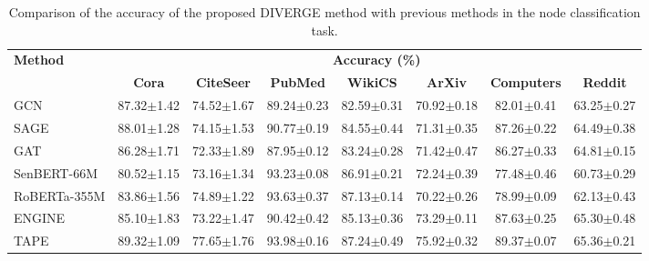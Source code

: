 \documentclass[a4paper,fleqn]{cas-sc}
\begin{document}
\begin{table}[htbp]
\centering
\caption{Comparison of the accuracy of the proposed DIVERGE method with previous methods in the node classification task.}
\label{tab:diverge_node_classification_accuracy_sota}

\small
\setlength{\tabcolsep}{3pt}
\begin{tabular*}{\textwidth}{@{\extracolsep{\fill}} lccccccc @{}}
\toprule
\multirow{2}{*}{\textbf{Method}} & \multicolumn{7}{c}{\textbf{Accuracy (\%)}} \\
\cmidrule(lr){2-8}
 & \textbf{Cora} & \textbf{CiteSeer} & \textbf{PubMed} & \textbf{WikiCS} & \textbf{ArXiv} & \textbf{Computers} & \textbf{Reddit} \\
\midrule

GCN          & 87.32{\scriptsize$\pm$1.42} & 74.52{\scriptsize$\pm$1.67} & 89.24{\scriptsize$\pm$0.23} & 82.59{\scriptsize$\pm$0.31} & 70.92{\scriptsize$\pm$0.18} & 82.01{\scriptsize$\pm$0.41} & 63.25{\scriptsize$\pm$0.27} \\
SAGE         & 88.01{\scriptsize$\pm$1.28} & 74.15{\scriptsize$\pm$1.53} & 90.77{\scriptsize$\pm$0.19} & 84.55{\scriptsize$\pm$0.44} & 71.31{\scriptsize$\pm$0.35} & 87.26{\scriptsize$\pm$0.22} & 64.49{\scriptsize$\pm$0.38} \\
GAT          & 86.28{\scriptsize$\pm$1.71} & 72.33{\scriptsize$\pm$1.89} & 87.95{\scriptsize$\pm$0.12} & 83.24{\scriptsize$\pm$0.28} & 71.42{\scriptsize$\pm$0.47} & 86.27{\scriptsize$\pm$0.33} & 64.81{\scriptsize$\pm$0.15} \\
SenBERT-66M  & 80.52{\scriptsize$\pm$1.15} & 73.16{\scriptsize$\pm$1.34} & 93.23{\scriptsize$\pm$0.08} & 86.91{\scriptsize$\pm$0.21} & 72.24{\scriptsize$\pm$0.39} & 77.48{\scriptsize$\pm$0.46} & 60.73{\scriptsize$\pm$0.29} \\
RoBERTa-355M & 83.86{\scriptsize$\pm$1.56} & 74.89{\scriptsize$\pm$1.22} & 93.63{\scriptsize$\pm$0.37} & 87.13{\scriptsize$\pm$0.14} & 70.22{\scriptsize$\pm$0.26} & 78.99{\scriptsize$\pm$0.09} & 62.13{\scriptsize$\pm$0.43} \\
ENGINE       & 85.10{\scriptsize$\pm$1.83} & 73.22{\scriptsize$\pm$1.47} & 90.42{\scriptsize$\pm$0.42} & 85.13{\scriptsize$\pm$0.36} & 73.29{\scriptsize$\pm$0.11} & 87.63{\scriptsize$\pm$0.25} & 65.30{\scriptsize$\pm$0.48} \\
TAPE         & 89.32{\scriptsize$\pm$1.09} & 77.65{\scriptsize$\pm$1.76} & 93.98{\scriptsize$\pm$0.16} & 87.24{\scriptsize$\pm$0.49} & 75.92{\scriptsize$\pm$0.32} & 89.37{\scriptsize$\pm$0.07} & 65.36{\scriptsize$\pm$0.21} \\

\end{tabular*}
\end{table}
\end{document}
